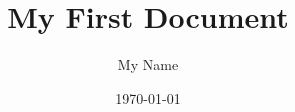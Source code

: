 \documentclass[10pt,a4paper]{report}
\begin{document}
\title{My First Document}
\author{My Name}
\date{\today}
\maketitle

\tableofcontents
\newpage
{}
\end{document}
